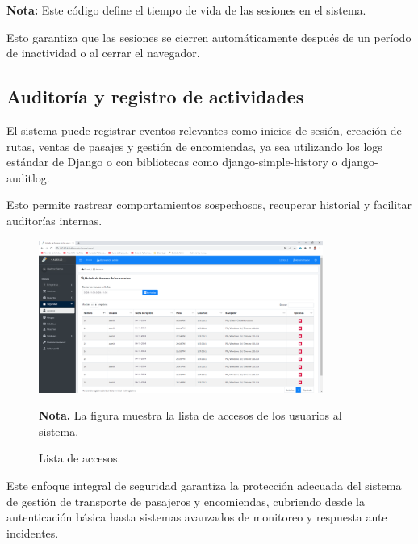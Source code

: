 	\textbf{Nota:} Este código define el tiempo de vida de las sesiones en el sistema.
	
	Esto garantiza que las sesiones se cierren automáticamente después de un período de inactividad o al cerrar el navegador.
	
\subsection{Auditoría y registro de actividades}

	El sistema puede registrar eventos relevantes como inicios de sesión, creación de rutas, ventas de pasajes y gestión de encomiendas, ya sea utilizando los logs estándar de Django o con bibliotecas como django-simple-history o django-auditlog.
	
	Esto permite rastrear comportamientos sospechosos, recuperar historial y facilitar auditorías internas.
	
	 \begin{figure}[!h] %
		\caption[Lista de accesos]
		{\newline Lista de accesos.} %
		\centering
		\includegraphics[width=0.83\textwidth]{imagenes/cap_3/Img_calibus/CALIBUS18.png} %
		\begin{flushleft}
			\hspace{1.20cm} \textbf{Nota.} La figura muestra la lista de accesos de los usuarios al sistema. %
		\end{flushleft}
		\vspace{-16pt}
		\label{fig:cali41} %
	\end{figure}
	
	
	Este enfoque integral de seguridad garantiza la protección adecuada del sistema de gestión de transporte de pasajeros y encomiendas, cubriendo desde la autenticación básica hasta sistemas avanzados de monitoreo y respuesta ante incidentes.
		


